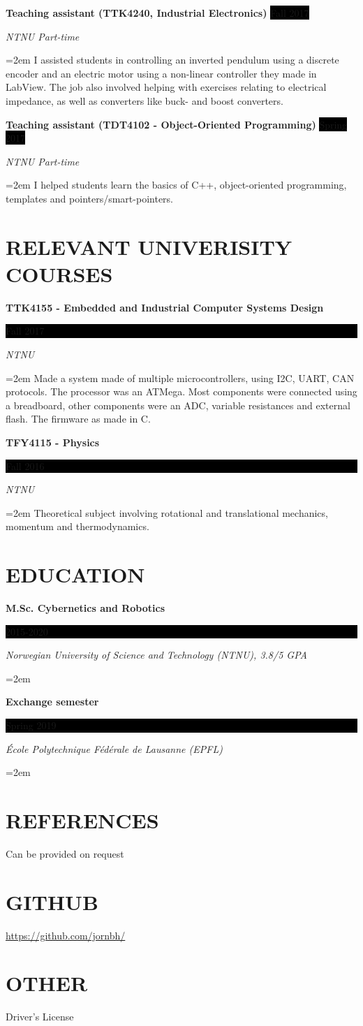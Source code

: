 \documentclass[paper=a4,fontsize=11pt,norsk]{scrartcl} %
\newlength{\spacebox}
\newcommand{\NewPart}[1]{\section*{\uppercase{#1}}}
\newcommand{\PersonalEntry}[2]{
		\noindent\hangindent=2em\hangafter=0 %
		\parbox{\spacebox}{        %
		\textit{#1}}		       %
		\hspace{1.5em} #2 \par}    %
\newcommand{\EducationEntry}[4]{
		\noindent \textbf{#1} \hfill      %
		\colorbox{Black}{%
			\parbox{6em}{%
			\hfill\color{White}#2}} \par  %
		\noindent \textit{#3} \par        %
		\noindent\hangindent=2em\hangafter=0 \small #4 %
		\normalsize \par}
\newcommand{\WorkEntry}[4]{				  %
		\noindent \textbf{#1} \hfill      %
		\colorbox{Black}{\color{White}#2} \par  %
		\noindent \textit{#3} \par              %
		\noindent\hangindent=2em\hangafter=0 \small #4 %
		\normalsize \par}
\begin{document}
\WorkEntry{Teaching assistant (TTK4240, Industrial Electronics)}{Fall 2017}{NTNU Part-time}
{I assisted students in controlling an inverted pendulum using a discrete encoder and an electric motor using a non-linear controller they made in LabView. The job also involved helping with exercises relating to electrical impedance, as well as converters like buck- and boost converters.
}

\WorkEntry{Teaching assistant (TDT4102 - Object-Oriented Programming)}{Spring 2017}{NTNU Part-time}
{I helped students learn the basics of C++, object-oriented programming, templates and pointers/smart-pointers.
}


\NewPart{Relevant univerisity Courses}{}

\EducationEntry{TTK4155 - Embedded and Industrial Computer Systems Design}{Fall 2017}{NTNU}
{Made a system made of multiple microcontrollers, using I2C, UART, CAN protocols. The processor was an ATMega. Most components were connected using a breadboard, other components were an ADC, variable resistances and external flash. The firmware as made in C.
}


\EducationEntry{TFY4115 - Physics}{Fall 2016}{NTNU}
{Theoretical subject involving rotational and translational mechanics, momentum and thermodynamics.}






\NewPart{Education}{}

\EducationEntry{M.Sc. Cybernetics and Robotics}{2015-2020}{Norwegian University of Science and Technology (NTNU), 3.8/5 GPA}{}
\EducationEntry{Exchange semester}{Spring 2019}{École Polytechnique Fédérale de Lausanne (EPFL)}{}





\NewPart{References}{}
Can be provided on request



\NewPart{GitHub}{}
\url{https://github.com/jornbh/}
\NewPart{Other}{}
Driver's License
\end{document}
